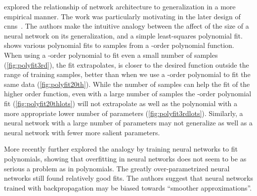 \documentclass[thesis]{subfiles}
\begin{document}
	\citet{denker1987large} explored the relationship of network architecture to generalization in a more empirical manner. The work was particularly motivating in the later design of \glspl{cnn}~\citep{lecun1989generalization, lecun1989backpropagation}. The authors make the intuitive analogy between the affect of the size of a neural network on its generalization, and a simple least-squares polynomial fit.  shows various polynomial fits to samples from a -order polynomial function. When using a -order polynomial to fit even a small number of samples (\cref{fig:polyfit3rd}), the fit extrapolates, \ie is closer to the desired function outside the range of training samples, better than when we use a -order polynomial to fit the same data (\cref{fig:polyfit20th}). While the number of samples can help the fit of the higher order function, even with a large number of samples the -order polynomial fit  (\cref{fig:polyfit20thlots}) will not extrapolate as well as the polynomial with a more appropriate lower number of parameters (\cref{fig:polyfit3rdlots}). Similarly, a neural network with a large number of parameters may not generalize as well as a neural network with fewer more salient parameters.
    
    More recently \citet{caruana2001overfitting} further explored the analogy by training neural networks to fit polynomials, showing that overfitting in neural networks does not seem to be as serious a problem as in polynomials. The greatly over-parametrized neural networks still found relatively good fits. The authors suggest that neural networks trained with backpropagation may be biased towards ``smoother approximations''.
	
	
\end{document}
